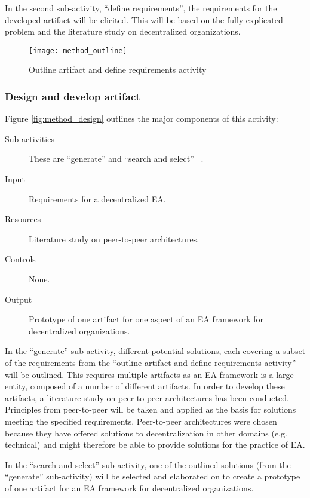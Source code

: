 In the second sub-activity, ``define requirements'', the requirements for the developed artifact will be elicited. This will be based on the fully explicated problem and the literature study on decentralized organizations.

\begin{figure}
\centering
\texttt{[image: method\_outline]}
\caption{Outline artifact and define requirements activity}
\label{fig:method_outline}
\end{figure}

\subsubsection*{Design and develop artifact}

Figure \ref{fig:method_design} outlines the major components of this activity:
\begin{description}
  \item[Sub-activities] These are ``generate'' and ``search and select'' ~\cite[Ch. 7]{johannessonPerjons2012}.
  \item[Input]  Requirements for a decentralized EA. 
  \item[Resources] Literature study on peer-to-peer architectures. 
  \item[Controls] None.
  \item[Output] Prototype of one artifact for one aspect of an EA framework for decentralized organizations. 
\end{description}

In the ``generate'' sub-activity, different potential solutions, each covering a subset of the requirements from the ``outline artifact and define requirements activity'' will be outlined. This requires multiple artifacts as an EA framework is a large entity, composed of a number of different artifacts. In order to develop these artifacts, a literature study on peer-to-peer architectures has been conducted. Principles from peer-to-peer will be taken and applied as the basis for solutions meeting the specified requirements. Peer-to-peer architectures were chosen because they have offered solutions to decentralization in other domains (e.g. technical) and might therefore be able to provide solutions for the practice of EA. 

In the ``search and select'' sub-activity, one of the outlined solutions (from the ``generate'' sub-activity) will be selected and elaborated on to create a prototype of one artifact for an EA framework for decentralized organizations. 


